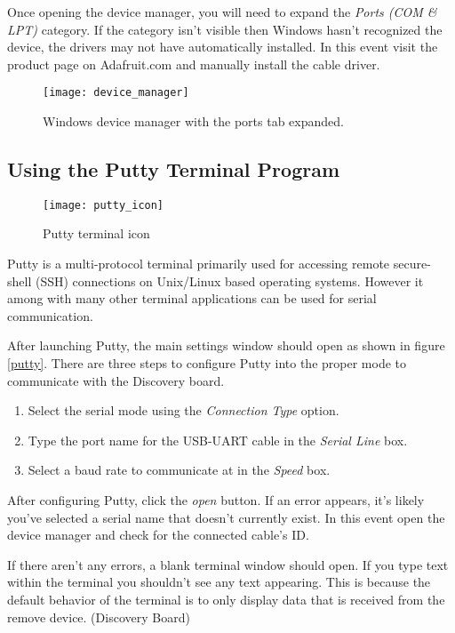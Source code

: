 \documentclass[11pt,fleqn]{book} %
\begin{document}
Once opening the device manager, you will need to expand the \textit{Ports (COM \& LPT)} category. If the category isn't visible then Windows hasn't recognized the device, the drivers may not have automatically installed. In this event visit the product page on Adafruit.com and manually install the cable driver.  

\begin{figure}[]
    \centering\texttt{[image: device\_manager]}
    \caption{Windows device manager with the ports tab expanded.}
    \label{device_manager}
\end{figure}

\subsection{Using the Putty Terminal Program}

\begin{figure}
    \centering\texttt{[image: putty\_icon]}
    \caption{Putty terminal icon}
\end{figure}

Putty is a multi-protocol terminal primarily used for accessing remote secure-shell (SSH) connections on Unix/Linux based operating systems. However it among with many other terminal applications can be used for serial communication.

After launching Putty, the main settings window should open as shown in figure \ref{putty}. There are three steps to configure Putty into the proper mode to communicate with the Discovery board. 
\begin{enumerate}
    \item Select the serial mode using the \textit{Connection Type} option. 
    \item Type the port name for the USB-UART cable in the \textit{Serial Line} box.
    \item Select a baud rate to communicate at in the \textit{Speed} box.
\end{enumerate}

After configuring Putty, click the \textit{open} button. If an error appears, it's likely you've selected a serial name that doesn't currently exist. In this event open the device manager and check for the connected cable's ID. 

If there aren't any errors, a blank terminal window should open. If you type text within the terminal you shouldn't see any text appearing. This is because the default behavior of the terminal is to only display data that is received from the remove device. (Discovery Board) 
\end{document}
